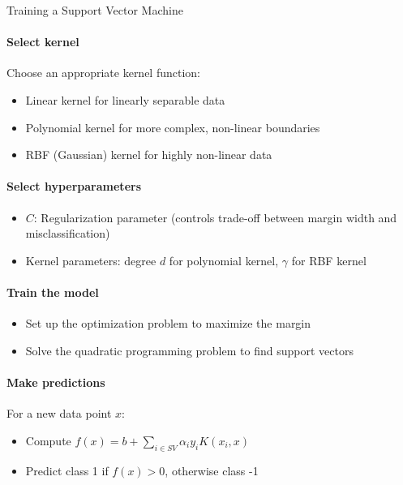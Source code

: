 \begin{KR}{Training a Support Vector Machine}\\
\paragraph{Select kernel}
Choose an appropriate kernel function:
\begin{itemize}
    \item Linear kernel for linearly separable data
    \item Polynomial kernel for more complex, non-linear boundaries
    \item RBF (Gaussian) kernel for highly non-linear data
\end{itemize}

\paragraph{Select hyperparameters}
\begin{itemize}
    \item $C$: Regularization parameter (controls trade-off between margin width and misclassification)
    \item Kernel parameters: degree $d$ for polynomial kernel, $\gamma$ for RBF kernel
\end{itemize}

\paragraph{Train the model}
\begin{itemize}
    \item Set up the optimization problem to maximize the margin
    \item Solve the quadratic programming problem to find support vectors
\end{itemize}

\paragraph{Make predictions}
For a new data point $x$:
\begin{itemize}
    \item Compute $f(x) = b + \sum_{i \in SV} \alpha_i y_i K(x_i, x)$
    \item Predict class 1 if $f(x) > 0$, otherwise class -1
\end{itemize}
\end{KR}

